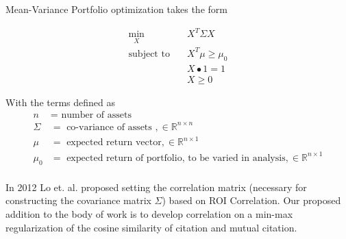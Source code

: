 Mean-Variance Portfolio optimization takes the form

\begin{align*}
\min_{X}& \quad X^T \Sigma X \\
\text{subject to}& \quad X^T \mu \geq \mu_0 \\
& \quad X \bullet 1 = 1 \\
& \quad X \geq 0
\end{align*}

With the terms defined as 
\begin{align*}
n &= \text{ number of assets} \\
\Sigma &= \text{ co-variance of assets }, \in \mathbb{R}^{n \times n} \\
\mu &= \text{ expected return vector}, \in \mathbb{R}^{n \times 1} \\
\mu_0 &= \text{ expected return of portfolio, to be varied in analysis}, \in \mathbb{R}^{n \times 1} \\
\end{align*}

In 2012 Lo et. al. proposed setting the correlation matrix (necessary for constructing the covariance matrix $\Sigma$) based on ROI Correlation. Our proposed addition to the body of work is to develop correlation on a min-max regularization of the cosine similarity of citation and mutual citation.

